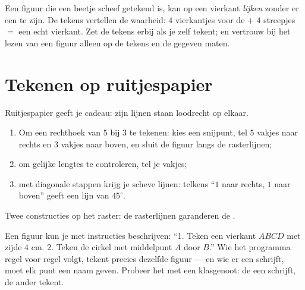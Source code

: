 \begin{example}\label{ex:g3:shapes:marks}
Een figuur die een beetje scheef getekend is, kan op een vierkant
\emph{lijken} zonder er een te zijn. De tekens vertellen de waarheid: $4$
vierkantjes voor de  $+$ $4$ streepjes $=$ een echt
vierkant. Zet de tekens erbij als je zelf tekent; en vertrouw bij het
lezen van een figuur alleen op de tekens en de gegeven maten.
\end{example}

\section{Tekenen op ruitjespapier}

\begin{method}\label{met:g3:shapes:grid}
Ruitjespapier geeft je  cadeau: zijn lijnen staan loodrecht
op elkaar.
\begin{enumerate}
  \item Om een rechthoek van $5$ bij $3$ te tekenen: kies een snijpunt,
        tel $5$ vakjes naar rechts en $3$ vakjes naar boven, en sluit de
        figuur langs de rasterlijnen;
  \item om gelijke lengtes te controleren, tel je vakjes;
  \item met diagonale stappen krijg je scheve lijnen: telkens ``$1$ naar
        rechts, $1$ naar boven'' geeft een lijn van $45^\circ$.
\end{enumerate}
\end{method}

\begin{omfigure}

{\small Twee constructies op het raster: de rasterlijnen garanderen de
.}
\end{omfigure}

\begin{example}\label{ex:g3:shapes:program}
Een figuur kun je met instructies beschrijven:
``1. Teken een vierkant $ABCD$ met zijde $4$ cm. 2. Teken de cirkel met
middelpunt $A$ door $B$.'' Wie het programma regel voor regel volgt,
tekent precies dezelfde figuur --- en wie er een schrijft, moet elk punt
een naam geven. Probeer het met een klasgenoot: de een schrijft, de ander
tekent.
\end{example}

